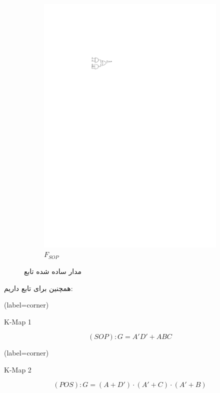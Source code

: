\begin{figure}[h]
\begin{subfigure}[b]{0.3\textwidth}
		\includegraphics[width=\textwidth]{fig/Q1_F_SOP.pdf}
		\caption{$F_{SOP}$}
		\label{fig:F_SOP}
	\end{subfigure}
	\caption{مدار ساده شده تابع }
	\label{fig:مدار یاده شده اف}
\end{figure}




همچنین برای تابع  داریم:


\begin{latin}
	\begin{minipage}{0.48\textwidth}
		\centering
		\begin{karnaugh-map}[4][4][1][$B$][$A$][$D$][$C$](label=corner)
		\end{karnaugh-map}
		\caption{K-Map 1}
		$$ (SOP):G=A'D' + ABC$$
	\end{minipage}
	\hfill
	\begin{minipage}{0.48\textwidth}
		\centering
		\begin{karnaugh-map}[4][4][1][$B$][$A$][$D$][$C$](label=corner)
		\end{karnaugh-map}
		\caption{K-Map 2}
		$$ (POS):G=(A+D') \cdot (A'+C) \cdot (A'+B) $$
	\end{minipage}	
\end{latin}




